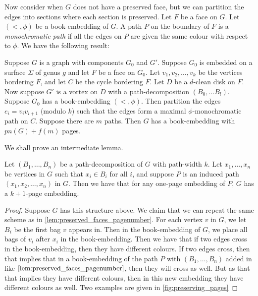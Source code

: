 Now consider when \(G\) does not have a preserved face, but we can partition the edges into sections where each section is preserved. Let \(F\) be a face on \(G\). Let \( (<, \phi) \) be a book-embedding of \(G\). A path \(P\) on the boundary of \(F\) is a \textit{monochromatic path} if all the edges on \(P\) are given the same colour with respect to \( \phi \). We have the following result:
\begin{lemma}\label{lem:vortices_mono_paths}
	Suppose \(G\) is a graph with components \(G_0\) and \(G'\). Suppose \(G_0\) is embedded on a surface \(\Sigma \) of genus \(g\) and let \(F\) be a face on \(G_0\). Let \(v_1, v_2, \ldots, v_k\) be the vertices bordering \(F\), and let \(C\) be the cycle bordering \(F\). Let \(D\) be a \(d\)-clean disk on \(F\). Now suppose \(G'\) is a vortex on \(D\) with a path-decomposition \((B_0, \ldots B_l)\). Suppose \(G_0\) has a book-embedding \((<, \phi)\). Then partition the edges \(e_i = v_i v_{i + 1}\) (modulo \(k\)) such that the edges form a maximal \(\phi \)-monochromatic path on \(C\). Suppose there are \(m\) paths. Then \(G\) has a book-embedding with \(pn(G) + f(m)\) pages.
\end{lemma}
We shall prove an intermediate lemma. 
\begin{lemma}\label{lem:one_page_decomposition}
	Let \((B_1, \ldots, B_n)\) be a path-decomposition of \(G\) with path-width \(k\). Let \(x_1, \ldots, x_n\) be vertices in \(G\) such that \(x_i \in B_i\) for all \(i\), and suppose \(P\) is an induced path \((x_1, x_2, \ldots, x_n)\) in \(G\). Then we have that for any one-page embedding of \(P\), \(G\) has a \(k + 1\)-page embedding. 
\end{lemma}
\begin{proof}
	Suppose \(G\) has this structure above.
	We claim that we can repeat the same scheme as in \cref{lem:preserved_faces_pagenumber}. For each vertex \(v\) in \(G\), we let \(B_i\) be the first bag \(v\) appears in. Then in the book-embedding of \(G\), we place all bags of \(v_i\) after \(x_i\) in the book-embedding. Then we have that if two edges cross in the book-embedding, then they have different colours. If two edges cross, then that implies that in a book-embedding of the path \(P\) with \((B_1, \ldots, B_n)\) added in like \(\cref{lem:preserved_faces_pagenumber}\), then they will cross as well. But as that that implies they have different colours, then in this new embedding they have different colours as well. Two examples are given in \cref{fig:preserving_pages}
\end{proof}


